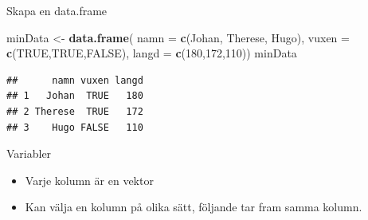 \documentclass[
  11pt,
  ignorenonframetext,
]{beamer}
\newenvironment{Shaded}{\begin{snugshade}}{\end{snugshade}}
\newcommand{\AttributeTok}[1]{\textcolor[rgb]{0.13,0.29,0.53}{#1}}
\newcommand{\ConstantTok}[1]{\textcolor[rgb]{0.56,0.35,0.01}{#1}}
\newcommand{\DecValTok}[1]{\textcolor[rgb]{0.00,0.00,0.81}{#1}}
\newcommand{\FunctionTok}[1]{\textcolor[rgb]{0.13,0.29,0.53}{\textbf{#1}}}
\newcommand{\NormalTok}[1]{#1}
\newcommand{\OtherTok}[1]{\textcolor[rgb]{0.56,0.35,0.01}{#1}}
\newcommand{\SpecialCharTok}[1]{\textcolor[rgb]{0.81,0.36,0.00}{\textbf{#1}}}
\newcommand{\StringTok}[1]{\textcolor[rgb]{0.31,0.60,0.02}{#1}}
\providecommand{\tightlist}{%
  \setlength{\itemsep}{0pt}\setlength{\parskip}{0pt}}
\begin{document}
\begin{frame}[fragile]{Skapa en data.frame}
\label{skapa-en-data.frame}
\begin{Shaded}
\begin{Highlighting}[]
\NormalTok{minData }\OtherTok{\textless{}{-}} \FunctionTok{data.frame}\NormalTok{(}
  \AttributeTok{namn =} \FunctionTok{c}\NormalTok{(}\StringTok{\textquotesingle{}Johan\textquotesingle{}}\NormalTok{, }\StringTok{\textquotesingle{}Therese\textquotesingle{}}\NormalTok{, }\StringTok{\textquotesingle{}Hugo\textquotesingle{}}\NormalTok{), }
  \AttributeTok{vuxen =} \FunctionTok{c}\NormalTok{(}\ConstantTok{TRUE}\NormalTok{,}\ConstantTok{TRUE}\NormalTok{,}\ConstantTok{FALSE}\NormalTok{), }
  \AttributeTok{langd =} \FunctionTok{c}\NormalTok{(}\DecValTok{180}\NormalTok{,}\DecValTok{172}\NormalTok{,}\DecValTok{110}\NormalTok{))}
\NormalTok{minData}
\end{Highlighting}
\end{Shaded}

\begin{verbatim}
##      namn vuxen langd
## 1   Johan  TRUE   180
## 2 Therese  TRUE   172
## 3    Hugo FALSE   110
\end{verbatim}
\end{frame}

\begin{frame}[fragile]{Variabler}
\label{variabler}
\begin{itemize}
\tightlist
\item
  Varje kolumn är en vektor
\item
  Kan välja en kolumn på olika sätt, följande tar fram samma kolumn.
\end{itemize}

\begin{Shaded}
\end{Shaded}
\end{frame}
\end{document}
